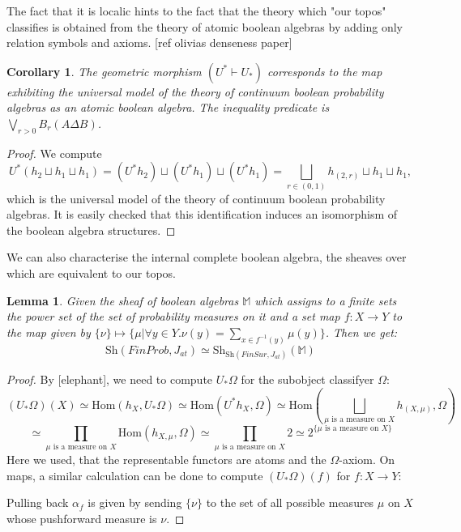\documentclass[a4paper]{amsproc}
\theoremstyle{plain}
\newtheorem{lemma}{Lemma}[section]
\newtheorem{corollary}{Corollary}[section]
\theoremstyle{definition}
\theoremstyle{remark}
\numberwithin{equation}{section}
\begin{document}
The fact that it is localic hints to the fact that the theory which "our topos" classifies is obtained from the theory of atomic boolean algebras by adding only relation symbols and axioms. [ref olivias denseness paper]
\begin{corollary} The geometric morphism $(U^*\vdash U_*)$ corresponds to the map exhibiting the universal model of the theory of continuum boolean probability algebras as an atomic boolean algebra. The inequality predicate is $\bigvee_{r>0} B_r ( A\Delta B )$.%
\end{corollary}
\begin{proof} We compute 
\[U^*(h_2\sqcup h_1 \sqcup h_1)= (U^*h_2)\sqcup (U^*h_1)\sqcup (U^*h_1)=\bigsqcup_{r\in (0,1)}h_{(2,r)}\sqcup h_1 \sqcup h_1, \] which is the universal model of the theory of continuum boolean probability algebras. It is easily checked that this identification induces an isomorphism of the boolean algebra structures.
\end{proof}%
We can also characterise the internal complete boolean algebra, the sheaves over which are equivalent to our topos.
\begin{lemma} Given the sheaf of boolean algebras $\mathbb{M}$ which assigns to a finite sets the power set of the set of probability measures on it and a set map $f:X\rightarrow Y$ to the map given by $\{\nu \}\mapsto \{\mu| \forall y\in Y. \nu(y)=\sum_{x\in f^{-1}(y)}\mu(y)  \}$. Then we get:
\[\text{Sh}(FinProb,J_{at})\simeq \text{Sh}_{\text{Sh}(FinSur,J_{at})}(\mathbb{M}) \]
\end{lemma}
\begin{proof} By [elephant], we need to compute $U_*\Omega$ for the subobject classifyer $\Omega$:
\[(U_*\Omega)(X)\simeq \text{Hom}(h_X,U_*\Omega)\simeq \text{Hom}(U^*h_X,\Omega)\simeq \text{Hom}(\bigsqcup_{\mu \text{ is a measure on }X}h_{(X,\mu)},\Omega)\]
\[\simeq \prod_{\mu \text{ is a measure on }X}\text{Hom}(h_{X,\mu},\Omega)\simeq \prod_{\mu \text{ is a measure on }X} 2\simeq 2^{\{\mu \text{ is a measure on }X\} } 
 \]
 Here we used, that the representable functors are atoms and the $\Omega$-axiom.
 On maps, a similar calculation can be done to compute $(U_*\Omega)(f)$ for $f:X\rightarrow Y$:
 \begin{center}
\end{center}
Pulling back $\alpha_f$ is given by sending $\{\nu\}$ to the set of all possible measures $\mu$ on $X$ whose pushforward measure is $\nu$.  
\end{proof} 
\end{document}

